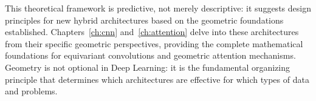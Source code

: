This theoretical framework is predictive, not merely descriptive: it suggests design principles for new hybrid architectures based on the geometric foundations established. Chapters~\ref{ch:cnn} and~\ref{ch:attention} delve into these architectures from their specific geometric perspectives, providing the complete mathematical foundations for equivariant convolutions and geometric attention mechanisms. Geometry is not optional in Deep Learning: it is the fundamental organizing principle that determines which architectures are effective for which types of data and problems.
